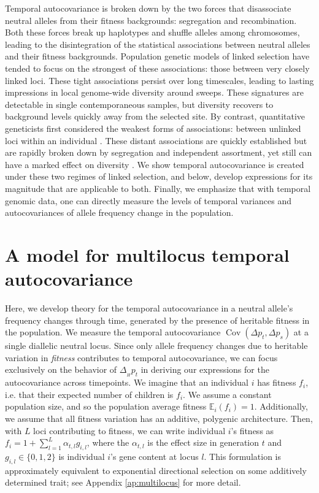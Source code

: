 \documentclass[11pt]{article}
\newcommand{\E}{\mathbb{E}}
\DeclareMathOperator{\cov}{Cov}
\begin{document}
Temporal autocovariance is broken down by the two forces that disassociate
neutral alleles from their fitness backgrounds: segregation and recombination.
Both these forces break up haplotypes and shuffle alleles among chromosomes,
leading to the disintegration of the statistical associations between neutral
alleles and their fitness backgrounds. Population genetic models of linked
selection have tended to focus on the strongest of these associations: those
between very closely linked loci. These tight associations persist over long
timescales, leading to lasting impressions in local genome-wide diversity
around sweeps. These signatures are detectable in single contemporaneous
samples, but diversity recovers to background levels quickly away from the
selected site. By contrast, quantitative geneticists first considered the
weakest forms of associations: between unlinked loci within an individual
\parencite{Morley1954-yp, Robertson1961-ho, Santiago1995-hx}. These distant
associations are quickly established but are rapidly broken down by segregation
and independent assortment, yet still can have a marked effect on diversity
\parencite{Robertson1961-ho,Santiago1995-hx}. We show temporal autocovariance
is created under these two regimes of linked selection, and below, develop
expressions for its magnitude that are applicable to both. Finally, we
emphasize that with temporal genomic data, one can directly measure the levels
of temporal variances and autocovariances of allele frequency change in the
population.

\section{A model for multilocus temporal autocovariance}

Here, we develop theory for the temporal autocovariance in a neutral allele's
frequency changes through time, generated by the presence of heritable fitness
in the population. We measure the temporal autocovariance $\cov(\Delta p_t,
\Delta p_s)$ at a single diallelic neutral locus. Since only allele frequency
changes due to heritable variation in \emph{fitness} contributes to temporal
autocovariance, we can focus exclusively on the behavior of $\Delta_{_H} p_t$
in deriving our expressions for the autocovariance across timepoints. We
imagine that an individual $i$ has fitness $f_i$, i.e. that their expected
number of children is $f_i$. We assume a constant population size, and so the
population average fitness $\E_i(f_i) = 1$. Additionally, we assume that all
fitness variation has an additive, polygenic architecture. Then, with $L$ loci
contributing to fitness, we can write individual $i$'s fitness as $f_i = 1 +
\sum_{l=1}^L \alpha_{t,l} g_{i,l}$, where the $\alpha_{t,l}$ is the effect size
in generation $t$ and $g_{i,l} \in \{0, 1, 2\}$ is individual $i$'s gene
content at locus $l$. This formulation is approximately equivalent to
exponential directional selection on some additively determined trait; see
Appendix \ref{ap:multilocus} for more detail.
\end{document}
